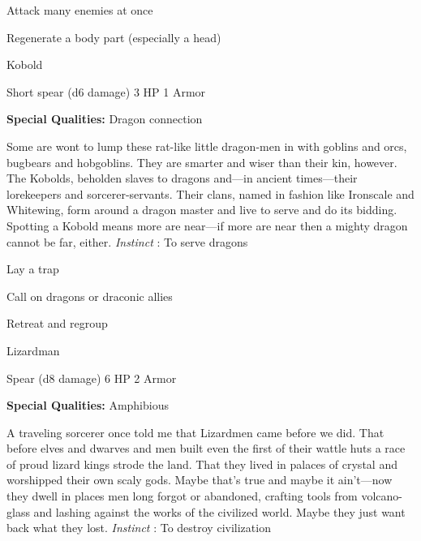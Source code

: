 \startitemize[1,packed]

\item Attack many enemies at once

 
\item Regenerate a body part (especially a head)


\stopitemize
 
\startMonsterName
Kobold	 
\stopMonsterName
 

Short spear (d6 damage)	3 HP	1 Armor

 


 
\startMonsterQualities
{\bf Special Qualities:}  Dragon connection
\stopMonsterQualities
 
\startMonsterDescription
Some are wont to lump these rat-like little dragon-men in with goblins and orcs, bugbears and hobgoblins. They are smarter and wiser than their kin, however. The Kobolds, beholden slaves to dragons and—in ancient times—their lorekeepers and sorcerer-servants. Their clans, named in fashion like Ironscale and Whitewing, form around a dragon master and live to serve and do its bidding. Spotting a Kobold means more are near—if more are near then a mighty dragon cannot be far, either. {\em Instinct} : To serve dragons
\stopMonsterDescription
 
\startitemize[1,packed]

\item Lay a trap

 
\item Call on dragons or draconic allies

 
\item Retreat and regroup


\stopitemize
 
\startMonsterName
Lizardman	 
\stopMonsterName
 

Spear (d8 damage)	6 HP	2 Armor

 


 
\startMonsterQualities
{\bf Special Qualities:}  Amphibious
\stopMonsterQualities
 
\startMonsterDescription
A traveling sorcerer once told me that Lizardmen came before we did. That before elves and dwarves and men built even the first of their wattle huts a race of proud lizard kings strode the land. That they lived in palaces of crystal and worshipped their own scaly gods. Maybe that’s true and maybe it ain’t—now they dwell in places men long forgot or abandoned, crafting tools from volcano-glass and lashing against the works of the civilized world. Maybe they just want back what they lost. {\em Instinct} : To destroy civilization
\stopMonsterDescription
 
